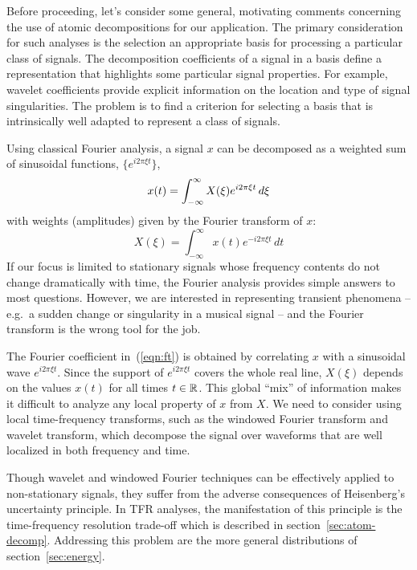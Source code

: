 Before proceeding, let's consider some general, motivating comments
concerning the use of atomic decompositions for our application.  The
primary consideration for such analyses is the selection an appropriate
basis for processing a particular class of signals.  
The decomposition coefficients of a signal in a basis define a representation 
that highlights some particular signal properties.  For example, wavelet
coefficients provide explicit information on the location and type of signal
singularities.  The problem is to find a criterion for selecting a basis that
is intrinsically well adapted to represent a class of signals.

Using classical Fourier analysis, a signal $x$ can be decomposed as a
weighted sum of sinusoidal functions, $\{e^{i2\pi \xi t}\}$,
\[
x(t) = %
\integral X(\xi) e^{i2\pi \xi t}\, d\xi
\]
with weights (amplitudes) given by the Fourier transform
of $x$:
\begin{equation}
\label{eqn:ft}
X(\xi) = \int_{-\infty}^{\infty}x(t) e^{-i2\pi \xi t}\, dt
\end{equation}
If our focus is limited to stationary signals whose frequency contents
do not change dramatically with time, the Fourier analysis provides
simple answers to most questions.  However, we are interested in
representing transient phenomena -- e.g.~a sudden change or singularity in a 
musical signal -- and the Fourier transform is the wrong tool for the job.

The Fourier coefficient in~(\ref{eqn:ft}) is obtained by correlating $x$
with a sinusoidal wave $e^{i2\pi\xi t}$.  Since the support 
of $e^{i2\pi\xi t}$ covers the whole real line, $X(\xi)$ depends 
on the values $x(t)$ for all times $t \in \mathbb{R}$.  This global ``mix'' of
information makes it difficult to analyze any local property of $x$
from $X$.  We need to consider using local time-frequency
transforms, such as the windowed Fourier transform and wavelet
transform, which decompose the signal over waveforms that are well
localized in both frequency and time.

Though wavelet and windowed Fourier techniques can be effectively applied to
non-stationary signals, they suffer from the adverse consequences of
Heisenberg's uncertainty principle.  In TFR analyses, the manifestation of
this principle is the time-frequency resolution trade-off which is
described in section~\ref{sec:atom-decomp}.  Addressing this problem are the
more general distributions of section~\ref{sec:energy}. 


